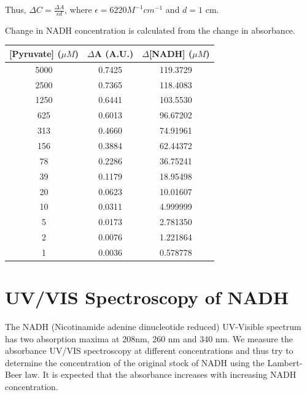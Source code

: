 \documentclass[a4paper,10pt]{article}
\begin{document}
                \begin{center}
                    Thus, $\Delta C = \frac{\Delta A}{\epsilon d}$,
                    where $\epsilon = 6220 M^{-1} cm^{-1}$ and $d = 1$ cm.
                \end{center}
                
                \noindent Change in NADH concentration is calculated from the change in absorbance.\\
                \begin{center}
                    \begin{tabular}{ c | c | c }
                        [Pyruvate] ($\mu M$) & $\Delta$A (A.U.) & $\Delta$[NADH] ($\mu M$) \\
                        \hline 
                        \hline 
                        5000 & 0.7425 & 119.3729 \\
                        2500 & 0.7365 & 118.4083 \\
                        1250 & 0.6441 & 103.5530 \\
                         625 & 0.6013 & 96.67202 \\
                         313 & 0.4660 & 74.91961 \\
                         156 & 0.3884 & 62.44372 \\
                          78 & 0.2286 & 36.75241 \\
                          39 & 0.1179 & 18.95498 \\
                          20 & 0.0623 & 10.01607 \\
                          10 & 0.0311 & 4.999999 \\
                           5 & 0.0173 & 2.781350 \\
                           2 & 0.0076 & 1.221864 \\
                           1 & 0.0036 & 0.578778 \\
                    \end{tabular}
                \end{center}

    \pagebreak

    \section{UV/VIS Spectroscopy of NADH}
    The NADH (Nicotinamide adenine dinucleotide reduced) UV-Visible spectrum has two absorption maxima at 
    208nm, 260 nm and 340 nm. We measure the absorbance UV/VIS spectroscopy at different concentrations and thus 
    try to determine the concentration of the original stock of NADH using the Lambert-Beer law.
    It is expected that the absorbance increases with increasing NADH concentration. 
    
\end{document}
